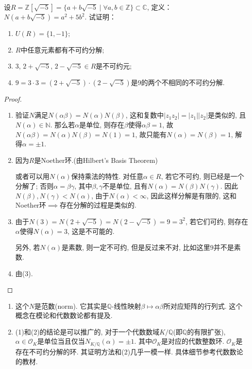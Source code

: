 \begin{problem}
    设$R = \mathbb{Z}[\sqrt{-5}] = \{a + b\sqrt{-5} \mid \forall a, b \in\mathbb{Z}\} \subset \mathbb{C}$,
定义：$N(a + b\sqrt{-5}) = a^2 + 5b^2$. 试证明：
\begin{enumerate}[(1)]
    \item $U(R) = \{1, -1\}$;
    \item $R$中任意元素都有不可约分解;
    \item $3$, $2 + \sqrt{-5}$, $2 - \sqrt{-5} \in R$是不可约元;
    \item $9 = 3 \cdot 3= (2 + \sqrt{-5}) \cdot (2 - \sqrt{-5})$是$9$的两个不相同的不可约分解.
\end{enumerate}
\end{problem}

\begin{proof}
\begin{enumerate}[(1)]
    \item 验证$N$满足$N(\alpha\beta) = N(\alpha)N(\beta)$, 这和复数中$|z_1z_2| = |z_1||z_2|$是类似的, 且$N(\alpha) \in \mathbb{N}$. 那么若$\alpha$是单位, 则存在$\beta$使得$\alpha\beta = 1$, 故$N(\alpha\beta) = N(\alpha)N(\beta) = N(1) = 1$, 故只能有$N(\alpha) = N(\beta) = 1$, 解得$\alpha = \pm 1$.
    \item 因为$R$是Noether环.(由Hilbert's Basis Theorem)
    
    或者可以用$N(\alpha)$保持乘法的特性. 对任意$\alpha \in R$, 若它不可约, 则已经是一个分解了; 否则$\alpha = \beta\gamma$, 其中$\beta, \gamma$不是单位, 且有$N(\alpha) = N(\beta)N(\gamma)$. 因此$N(\beta), N(\gamma) < N(\alpha)$, 由于$N(\alpha) < \infty$, 因此这样分解是有限的, 这和Noether环$\implies$存在分解的过程是类似的.
    \item 由于$N(3) = N(2 + \sqrt{-5}) = N(2 - \sqrt{-5}) = 9 = 3^2$, 若它们可约, 则存在$\alpha$使得$N(\alpha) = 3$, 这是不可能的.
    
    另外, 若$N(\alpha)$是素数, 则一定不可约, 但是反过来不对, 比如这里$9$并不是素数.
    \item 由(3).
\end{enumerate}
\end{proof}

\begin{remark}
    \begin{enumerate}[1.]
    \item 这个$N$是范数(norm). 它其实是$\mathbb{Q}$-线性映射$\beta \mapsto \alpha\beta$所对应矩阵的行列式. 这个概念在模论和代数数论都有提及.
    \item (1)和(2)的结论是可以推广的, 对于一个代数数域$K/\mathbb{Q}$(即$\mathbb{Q}$的有限扩张), $\alpha \in \mathcal{O}_K$是单位当且仅当$N_{K/\mathbb{Q}}(\alpha) = \pm1$. 其中$\mathcal{O}_K$是对应的代数整数环. $\mathcal{O}_K$是存在不可约分解的环. 其证明方法和(2)几乎一模一样. 具体细节参考代数数论的教材.
    \end{enumerate}
\end{remark}

